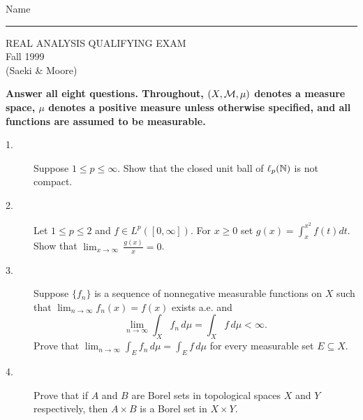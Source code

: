 \documentclass[bbb]{report}
\def\ds{\displaystyle}
\def\N{{\Bbb N}}
\begin{document}
\begin{Large}

\hfill Name \rule{2.5in}{.01in}
\par
\vspace{.25in}

\begin{center}
   REAL ANALYSIS QUALIFYING EXAM \\
   Fall 1999 \\
   (Saeki \& Moore) \\
\end{center}


\vspace{.1in}

\end{Large}

\begin{large}


{\bf Answer all eight questions.
Throughout, $(X, {\cal M} ,\mu)$ denotes a measure space,
$\mu$ denotes a positive measure unless otherwise specified, and all
functions are assumed to be measurable.}

\vspace{.25in}


\begin{description}

\item[1.]
Suppose $1\leq p\leq \infty$.
Show that the closed unit ball of $\ell_p(\N)$ is not compact.


\vspace{.15in}

\item[2.]
Let $1\leq p\leq 2$ and $f\in L^p([0,\infty])$.
For $x\geq 0$ set $g(x)=\ds\int^{x^2}_x f(t)dt$.
Show that $\ds\lim_{x\to\infty}\,\ds\frac{g(x)}{x}=0$.

\vspace{.15in}

\item[3.]
Suppose $\{f_n\}$ is a sequence of nonnegative measurable functions
on $X$ such that $\ds\lim_{n\to\infty} f_n(x)=f(x)$ exists a.e. and
$$\lim_{n\to\infty} \int_X f_n\, d\mu= \int_Xf\,d\mu<\infty.$$
Prove that $\ds\lim_{n\to\infty} \ds\int_E f_n\,d\mu=\ds\int_Ef\,d\mu$
for every measurable set $E\subseteq X$.


\vspace{.15in}

\item[4.]
Prove that if $A$ and $B$ are Borel sets in topological spaces $X$
and $Y$ respectively, then $A\times B$ is a Borel set in $X\times Y$.


\end{description}
\end{large}
\end{document}
